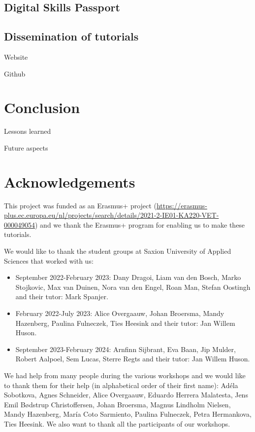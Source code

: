 \documentclass[
]{article}
\begin{document}
\hypertarget{digital-skills-passport}{%
\subsection{Digital Skills Passport}\label{digital-skills-passport}}

\hypertarget{dissemination-of-tutorials}{%
\subsection{Dissemination of tutorials}\label{dissemination-of-tutorials}}

Website

Github

\hypertarget{conclusion}{%
\section{Conclusion}\label{conclusion}}

Lessons learned

Future aspects

\hypertarget{acknowledgements}{%
\section{Acknowledgements}\label{acknowledgements}}

This project was funded as an Erasmus+ project (\url{https://erasmus-plus.ec.europa.eu/nl/projects/search/details/2021-2-IE01-KA220-VET-000049054}) and we thank the Erasmus+ program for enabling us to make these tutorials.

We would like to thank the student groups at Saxion University of Applied Sciences that worked with us:

\begin{itemize}
\item
  September 2022-February 2023: Dany Dragoi, Liam van den Bosch, Marko Stojkovic, Max van Duinen, Nora van den Engel, Roan Man, Stefan Oostingh and their tutor: Mark Spanjer.
\item
  February 2022-July 2023: Alice Overgaauw, Johan Broersma, Mandy Hazenberg, Paulina Fulneczek, Ties Heesink and their tutor: Jan Willem Huson.
\item
  September 2023-February 2024: Arnfinn Sijbrant, Eva Baan, Jip Mulder, Robert Aalpoel, Sem Lucas, Sterre Regts and their tutor: Jan Willem Huson.
\end{itemize}

We had help from many people during the various workshops and we would like to thank them for their help (in alphabetical order of their first name): Adéla Sobotkova, Agnes Schneider, Alice Overgaauw, Eduardo Herrera Malatesta, Jens Emil Bødstrup Christoffersen, Johan Broersma, Magnus Lindholm Nielsen, Mandy Hazenberg, María Coto Sarmiento, Paulina Fulneczek, Petra Hermankova, Ties Heesink. We also want to thank all the participants of our workshops.
\end{document}
